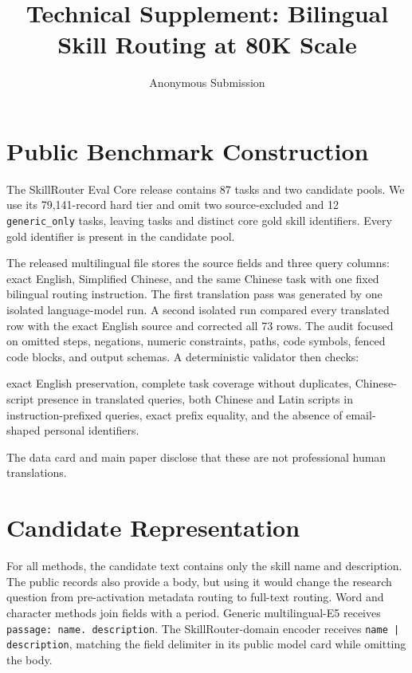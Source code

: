 \documentclass[letterpaper]{article}
\title{Technical Supplement: Bilingual Skill Routing at 80K Scale}
\author{Anonymous Submission}
\begin{document}
\maketitle

\section{Public Benchmark Construction}

The SkillRouter Eval Core release \cite{zheng2026skillrouter} contains 87 tasks
and two candidate pools.
We use its 79,141-record hard tier and omit two source-excluded and 12
\texttt{generic\_only} tasks, leaving \PublicTaskCount{} tasks and
\PublicGoldCount{} distinct core gold skill identifiers.  Every gold identifier
is present in the candidate pool.

The released multilingual file stores the source fields and three query
columns: exact English, Simplified Chinese, and the same Chinese task with one
fixed bilingual routing instruction.
The first translation pass was generated by one isolated language-model run.
A second isolated run compared every translated row with the exact English
source and corrected all 73 rows.  The audit focused on omitted steps,
negations, numeric constraints, paths, code symbols, fenced code blocks, and
output schemas.  A deterministic validator then checks:

exact English preservation, complete task coverage without duplicates,
Chinese-script presence in translated queries, both Chinese and Latin scripts
in instruction-prefixed queries, exact prefix equality, and the absence of
email-shaped personal identifiers.

The data card and main paper disclose that these are not professional human
translations.

\section{Candidate Representation}

For all methods, the candidate text contains only the skill name and
description.  The public records also provide a body, but using it would change
the research question from pre-activation metadata routing to full-text
routing.  Word and character methods join fields with a period.  Generic
multilingual-E5 receives \texttt{passage: name. description}.  The
SkillRouter-domain encoder receives \texttt{name | description}, matching the
field delimiter in its public model card while omitting the body.
\end{document}

